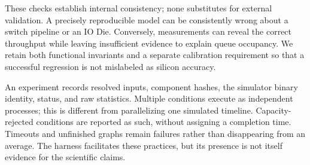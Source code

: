 These checks establish internal consistency; none substitutes for external validation. A precisely reproducible model can be consistently wrong about a switch pipeline or an IO Die. Conversely, measurements can reveal the correct throughput while leaving insufficient evidence to explain queue occupancy. We retain both functional invariants and a separate calibration requirement so that a successful regression is not mislabeled as silicon accuracy.

An experiment records resolved inputs, component hashes, the simulator binary identity, status, and raw statistics. Multiple conditions execute as independent processes; this is different from parallelizing one simulated timeline. Capacity-rejected conditions are reported as such, without assigning a completion time. Timeouts and unfinished graphs remain failures rather than disappearing from an average. The harness facilitates these practices, but its presence is not itself evidence for the scientific claims.
